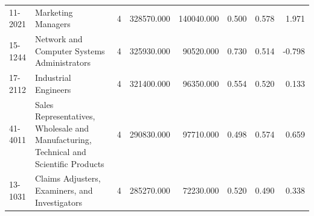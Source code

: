 \begin{table}
\begin{tabular}{llrrrrrr}
11-2021 & Marketing Managers & 4 & 328570.000 & 140040.000 & 0.500 & 0.578 & 1.971 \\
15-1244 & Network and Computer Systems Administrators & 4 & 325930.000 & 90520.000 & 0.730 & 0.514 & -0.798 \\
17-2112 & Industrial Engineers & 4 & 321400.000 & 96350.000 & 0.554 & 0.520 & 0.133 \\
41-4011 & Sales Representatives, Wholesale and Manufacturing, Technical and Scientific Products & 4 & 290830.000 & 97710.000 & 0.498 & 0.574 & 0.659 \\
13-1031 & Claims Adjusters, Examiners, and Investigators & 4 & 285270.000 & 72230.000 & 0.520 & 0.490 & 0.338 \\
\bottomrule
\end{tabular}
\end{table}
